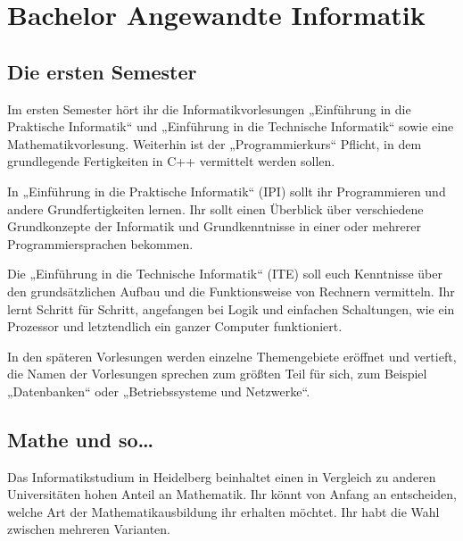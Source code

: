 \section{Bachelor Angewandte Informatik}

\subsection{Die ersten Semester}

Im ersten Semester hört ihr die Informatikvorlesungen „Einführung in die Praktische Informatik“ und „Einführung in die Technische Informatik“ sowie eine Mathematikvorlesung. Weiterhin ist der „Programmierkurs“ Pflicht, in dem grundlegende Fertigkeiten in C++ vermittelt werden sollen.

In „Einführung in die Praktische Informatik“ (IPI) sollt ihr Programmieren und andere Grundfertigkeiten lernen. Ihr sollt einen Überblick über verschiedene Grundkonzepte der Informatik und Grundkenntnisse in einer oder mehrerer Programmiersprachen bekommen.

Die „Einführung in die Technische Informatik“ (ITE) soll euch Kenntnisse über den grundsätzlichen Aufbau und die Funktionsweise von Rechnern vermitteln. Ihr lernt Schritt für Schritt, angefangen bei Logik und einfachen Schaltungen, wie ein Prozessor und letztendlich ein ganzer Computer funktioniert.

In den späteren Vorlesungen werden einzelne Themengebiete eröffnet und vertieft, die Namen der Vorlesungen sprechen zum größten Teil für sich, zum Beispiel „Datenbanken“ oder „Betriebssysteme und Netzwerke“.


\subsection{Mathe und so\dots}

Das Informatikstudium in Heidelberg beinhaltet einen in Vergleich zu anderen Universitäten hohen Anteil an Mathematik. Ihr könnt von Anfang an entscheiden, welche Art der Mathematikausbildung ihr erhalten möchtet. Ihr habt die Wahl zwischen mehreren Varianten.

